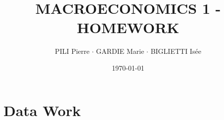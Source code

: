 \documentclass[12pt]{article}
\title{MACROECONOMICS 1 - HOMEWORK}
\author{PILI Pierre $\cdot$ GARDIE Marie $\cdot$ BIGLIETTI Isée}
\date{\today}
\begin{document}
\maketitle
\section{Data Work}
\end{document}
